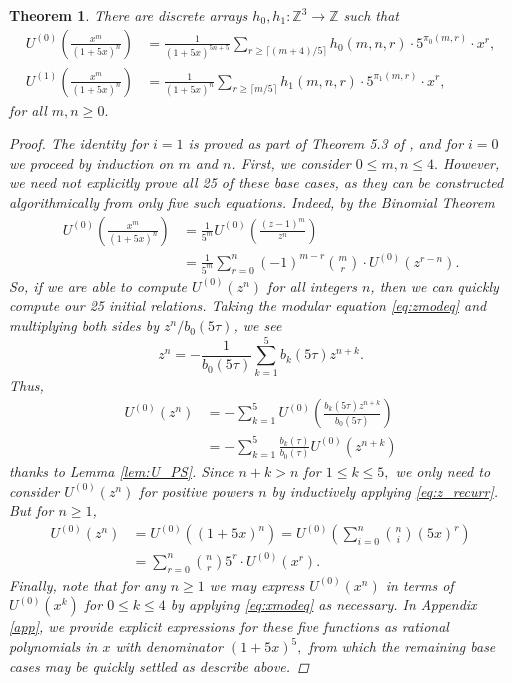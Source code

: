 \documentclass[12pt, reqno]{amsart}
\newtheorem{thm}{Theorem}[section]
\theoremstyle{definition}
\theoremstyle{remark}
\begin{document}
\begin{thm}\label{thm:h's}
There are discrete arrays $h_0, h_1 : \mathbb{Z}^3 \rightarrow \mathbb{Z}$ such that 
\begin{align*} 
U^{(0)}\left(\frac{x^m}{(1+5x)^n}\right) &= \frac{1}{(1+5x)^{5n+5}} \sum\limits_{r \geq \lceil (m+4)/5 \rceil} h_0(m,n,r) \cdot 5^{\pi_0(m,r)} \cdot x^r, \\
U^{(1)}\left(\frac{x^m}{(1+5x)^n}\right) &= \frac{1}{(1+5x)^n} \sum\limits_{r \geq \lceil m/5 \rceil} h_1(m,n,r) \cdot 5^{\pi_1(m,r)} \cdot x^r,
\end{align*}
for all $m, n \geq 0.$ 
\begin{proof}
The identity for $i=1$ is proved as part of Theorem 5.3 of \cite{BS}, and for $i=0$ we proceed by induction on $m$ and $n$. First, we consider $0 \leq m,n \leq 4.$ However, we need not explicitly prove all 25 of these base cases, as they can be constructed algorithmically from only five such equations. Indeed, by the Binomial Theorem 
\begin{align*} 
U^{(0)}\left(\frac{x^m}{(1+5x)^n}\right) &= \frac{1}{5^m} U^{(0)}\left(\frac{(z-1)^m}{z^n}\right) \\
&= \frac{1}{5^m} \sum\limits_{r=0}^n (-1)^{m-r} {m \choose r} \cdot U^{(0)}(z^{r-n}).
\end{align*}
So, if we are able to compute $U^{(0)}(z^{n})$ for all integers $n$, then we can quickly compute our 25 initial relations. Taking the modular equation \eqref{eq:zmodeq} and multiplying both sides by $z^n/b_0(5\tau)$, we see
\[z^n = -\frac{1}{b_0(5\tau)} \sum\limits_{k=1}^5 b_k(5\tau) z^{n+k}.\]
Thus,
\begin{align}
U^{(0)}(z^n) &= - \sum\limits_{k=1}^5 U^{(0)} \left(\frac{b_k(5\tau)z^{n+k}}{b_0(5\tau)}\right) \nonumber \\
&= -\sum\limits_{k=1}^5 \frac{b_k(\tau)}{b_0(\tau)} U^{(0)}(z^{n+k}) \label{eq:z_recurr}
\end{align}
thanks to Lemma \ref{lem:U_PS}. Since $n+k > n$ for $1 \leq k \leq 5,$ we only need to consider $U^{(0)}(z^n)$ for positive powers $n$ by inductively applying \eqref{eq:z_recurr}. But for $n \geq 1$,
\begin{align*} 
U^{(0)}(z^n) &= U^{(0)}((1+5x)^n) = U^{(0)}\left(\sum\limits_{i=0}^n {n \choose i} (5x)^r\right) \\
&= \sum\limits_{r=0}^n {n \choose r} 5^r \cdot U^{(0)}(x^r).
\end{align*}
Finally, note that for any $n \geq 1$ we may express $U^{(0)}(x^n)$ in terms of $U^{(0)}(x^k)$ for $0 \leq k \leq 4$ by applying \eqref{eq:xmodeq} as necessary. In Appendix \ref{app}, we provide explicit expressions for these five functions as rational polynomials in $x$ with denominator $(1+5x)^5,$ from which the remaining base cases may be quickly settled as describe above. 


\end{proof}
\end{thm}
\end{document}
